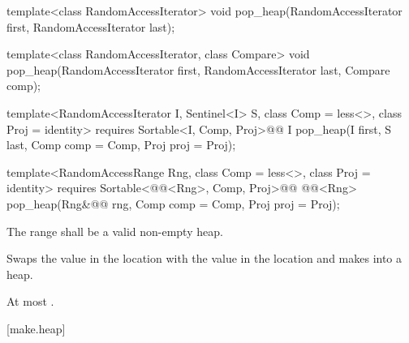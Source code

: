 %
\begin{removedblock}
\begin{itemdecl}
template<class RandomAccessIterator>
  void pop_heap(RandomAccessIterator first, RandomAccessIterator last);

template<class RandomAccessIterator, class Compare>
  void pop_heap(RandomAccessIterator first, RandomAccessIterator last,
                Compare comp);
\end{itemdecl}
\end{removedblock}
\begin{addedblock}
\begin{itemdecl}
template<RandomAccessIterator I, Sentinel<I> S, class Comp = less<>,
    class Proj = identity>
  requires Sortable<I, Comp, Proj>@\newtxt{()}@
  I pop_heap(I first, S last, Comp comp = Comp{}, Proj proj = Proj{});

template<RandomAccessRange Rng, class Comp = less<>, class Proj = identity>
  requires Sortable<@@<Rng>, Comp, Proj>@\newtxt{()}@
  @@<Rng>
    pop_heap(Rng&@\newtxt{\&}@ rng, Comp comp = Comp{}, Proj proj = Proj{});
\end{itemdecl}
\end{addedblock}

\begin{itemdescr}
\pnum
\requires
The range
shall be a valid non-empty heap.

\pnum
\effects
Swaps the value in the location 
with the value in the location
and makes
into a heap.

\begin{addedblock}
\pnum
\returns {}
\end{addedblock}

\pnum
\complexity
At most
.
\end{itemdescr}

[make.heap]{}

